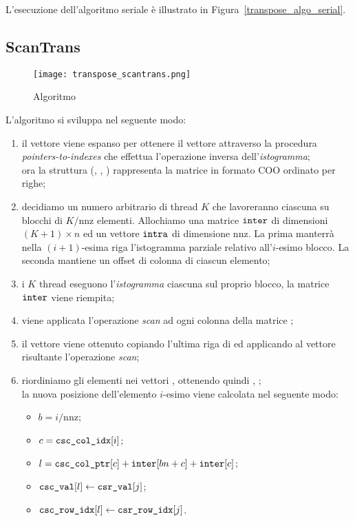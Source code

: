 L'esecuzione dell'algoritmo seriale è illustrato in Figura~\ref{transpose_algo_serial}.

\subsection{ScanTrans}

\begin{figure}[htbp]
    \centering
	\texttt{[image: transpose\_scantrans.png]}
	\caption{Algoritmo \ScanTrans}
	\label{transpose_algo_scantrans}
\end{figure}

L'algoritmo si sviluppa nel seguente modo:
\begin{enumerate}
    \item il vettore  viene espanso per ottenere il vettore  attraverso la procedura \emph{pointers-to-indexes} che effettua l'operazione inversa dell'\emph{istogramma}; \\
    ora la struttura (, , ) rappresenta la matrice in formato COO ordinato per righe;
    \item decidiamo un numero arbitrario di thread $K$ che lavoreranno ciascuna su blocchi di $K/\mathrm{nnz}$ elementi. Allochiamo una matrice $\texttt{inter}$ di dimensioni $(K+1) \times n$ ed un vettore $\texttt{intra}$ di dimensione $\mathrm{nnz}$. La prima manterrà nella $(i+1)$-esima riga l'istogramma parziale relativo all'$i$-esimo blocco. La seconda mantiene un offset di colonna di ciascun elemento;
    \item i $K$ thread eseguono l'\emph{istogramma} ciascuna sul proprio blocco, la matrice $\texttt{inter}$ viene riempita;
    \item viene applicata l'operazione \emph{scan} ad ogni colonna della matrice ;
    \item il vettore  viene ottenuto copiando l'ultima riga di  ed applicando al vettore risultante l'operazione \emph{scan};
    \item riordiniamo gli elementi nei vettori ,  ottenendo quindi , ; \\
    la nuova posizione dell'elemento $i$-esimo viene calcolata nel seguente modo:
    \begin{itemize}
        \item $b = i / \mathrm{nnz}$;
        \item $c = \texttt{csc\_col\_idx}[i]$;
        \item $l = \texttt{csc\_col\_ptr}[c] + \texttt{inter}[b n + c] + \texttt{inter}[c]$;
        \item $\texttt{csc\_val}[l] \leftarrow \texttt{csr\_val}[j]$;
        \item $\texttt{csc\_row\_idx}[l] \leftarrow \texttt{csr\_row\_idx}[j]$.
    \end{itemize}
\end{enumerate}

